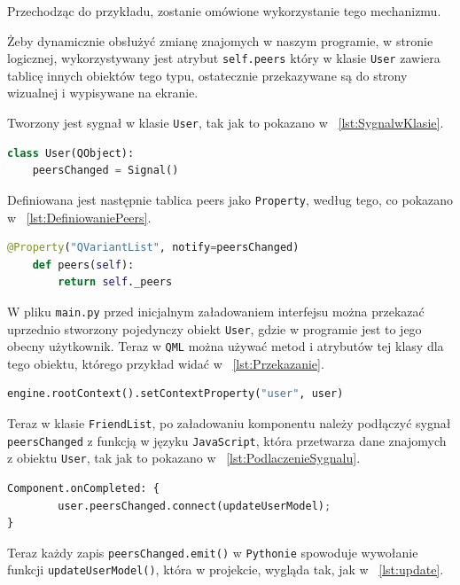 Przechodząc do przykładu, zostanie omówione wykorzystanie tego mechanizmu.

Żeby dynamicznie obsłużyć zmianę znajomych w naszym programie, w stronie logicznej, wykorzystywany jest atrybut \texttt{self.peers} który w klasie \texttt{User} zawiera tablicę innych obiektów tego typu, ostatecznie przekazywane są do strony wizualnej i wypisywane na ekranie.

Tworzony jest sygnał w klasie \texttt{User}, tak jak to pokazano w \lstlistingname{~\ref{lst:SygnalwKlasie}}. 
\begin{lstlisting}[language=Python, caption={Sygnał User}, label={lst:SygnalwKlasie}]
class User(QObject):
    peersChanged = Signal()
\end{lstlisting}    

Definiowana jest następnie tablica peers jako \texttt{Property}, według tego, co pokazano w \lstlistingname{~\ref{lst:DefiniowaniePeers}}. 
\begin{lstlisting}[language=Python, caption={Peers Property}, label={lst:DefiniowaniePeers}]
@Property("QVariantList", notify=peersChanged)
    def peers(self):
        return self._peers
\end{lstlisting}

W pliku \texttt{main.py} przed inicjalnym załadowaniem interfejsu można przekazać uprzednio stworzony pojedynczy obiekt \texttt{User}, gdzie w programie jest to jego obecny użytkownik. Teraz w \texttt{QML} można używać metod i atrybutów tej klasy dla tego obiektu, którego przykład widać w \lstlistingname{~\ref{lst:Przekazanie}}.

\begin{lstlisting}[language=Python, caption={Przekazanie inicjalnego obiektu}, label={lst:Przekazanie}]
engine.rootContext().setContextProperty("user", user)
\end{lstlisting}

Teraz w klasie \texttt{FriendList}, po załadowaniu komponentu należy podłączyć sygnał \texttt{peersChanged} z funkcją w języku \texttt{JavaScript}, która przetwarza dane znajomych z obiektu \texttt{User}, tak jak to pokazano w \lstlistingname{~\ref{lst:PodlaczenieSygnalu}}.

\begin{lstlisting}[language=Python, caption={Podłączenie sygnału do slota w QML}, label={lst:PodlaczenieSygnalu}]
Component.onCompleted: {
        user.peersChanged.connect(updateUserModel);
}
\end{lstlisting}
Teraz każdy zapis \texttt{peersChanged.emit()} w \texttt{Pythonie} spowoduje wywołanie funkcji \texttt{updateUserModel()}, która w projekcie, wygląda tak, jak w \lstlistingname{~\ref{lst:update}}.

